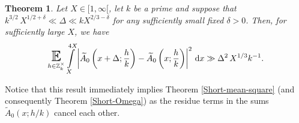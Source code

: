 \documentclass[a4paper,10pt,twoside]{amsart}
\newtheorem{theorem}{Theorem}[section]
\theoremstyle{definition}
\numberwithin{equation}{section}
\newcommand\E{\mathbb{E}}
\renewcommand\:{\colon}
\begin{document}
\begin{theorem}\label{ShortA_0-lower-bound}
Let $X\in[1,\infty[$, let $k$ be a prime and suppose that $k^{3/2}\,X^{1/2+\delta}\ll\Delta\ll kX^{2/3-\delta}$ for any sufficiently small fixed $\delta>0$. Then, for sufficiently large $X$, we have 
\begin{align*}
\mathop{\text{\LARGE$\E$}}_{h\in\mathbb Z_k^\times}\int\limits_X^{4X}\left|\widetilde A_0\left(x+\Delta;\frac hk\right)-\widetilde A_0\left(x;\frac hk\right)\right|^2\,\mathrm dx\gg\Delta^2\,X^{1/3}k^{-1}.
\end{align*}
\end{theorem}

\noindent Notice that this result immediately implies Theorem \ref{Short-mean-square} (and consequently Theorem \ref{Short-Omega}) as the residue terms in the sums $\widetilde A_0(x;h/k)$ cancel each other. 
  
\end{document}
